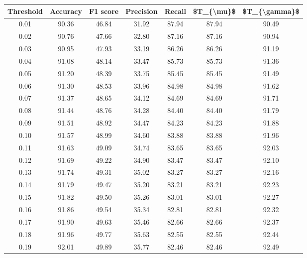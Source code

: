 \begin{tabular}{|c|c|c|c|c|c|c|}
\hline
 Threshold &  Accuracy &  F1 score &  Precision &  Recall &  \$T\_\{\textbackslash mu\}\$ &  \$T\_\{\textbackslash gamma\}\$ \\
\hline
      0.01 &     90.36 &     46.84 &      31.92 &   87.94 &      87.94 &         90.49 \\
      0.02 &     90.76 &     47.66 &      32.80 &   87.16 &      87.16 &         90.94 \\
      0.03 &     90.95 &     47.93 &      33.19 &   86.26 &      86.26 &         91.19 \\
      0.04 &     91.08 &     48.14 &      33.47 &   85.73 &      85.73 &         91.36 \\
      0.05 &     91.20 &     48.39 &      33.75 &   85.45 &      85.45 &         91.49 \\
      0.06 &     91.30 &     48.53 &      33.96 &   84.98 &      84.98 &         91.62 \\
      0.07 &     91.37 &     48.65 &      34.12 &   84.69 &      84.69 &         91.71 \\
      0.08 &     91.44 &     48.76 &      34.28 &   84.40 &      84.40 &         91.79 \\
      0.09 &     91.51 &     48.92 &      34.47 &   84.23 &      84.23 &         91.88 \\
      0.10 &     91.57 &     48.99 &      34.60 &   83.88 &      83.88 &         91.96 \\
      0.11 &     91.63 &     49.09 &      34.74 &   83.65 &      83.65 &         92.03 \\
      0.12 &     91.69 &     49.22 &      34.90 &   83.47 &      83.47 &         92.10 \\
      0.13 &     91.74 &     49.31 &      35.02 &   83.27 &      83.27 &         92.16 \\
      0.14 &     91.79 &     49.47 &      35.20 &   83.21 &      83.21 &         92.23 \\
      0.15 &     91.82 &     49.50 &      35.26 &   83.01 &      83.01 &         92.27 \\
      0.16 &     91.86 &     49.54 &      35.34 &   82.81 &      82.81 &         92.32 \\
      0.17 &     91.90 &     49.63 &      35.46 &   82.66 &      82.66 &         92.37 \\
      0.18 &     91.96 &     49.77 &      35.63 &   82.55 &      82.55 &         92.44 \\
      0.19 &     92.01 &     49.89 &      35.77 &   82.46 &      82.46 &         92.49 \\

\end{tabular}
